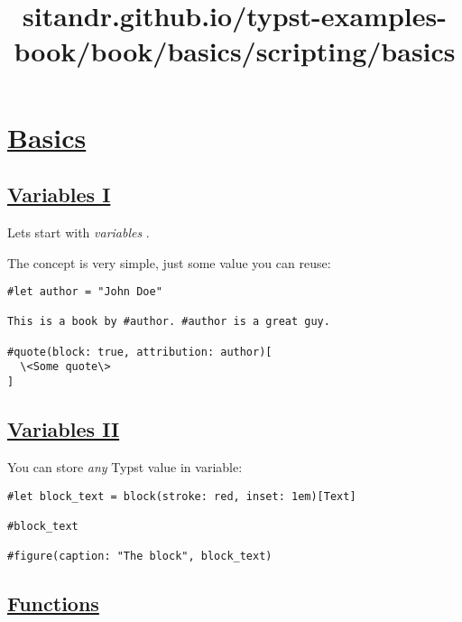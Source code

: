 \title{sitandr.github.io/typst-examples-book/book/basics/scripting/basics}

\section{\texorpdfstring{\hyperref[basics]{Basics}}{Basics}}\label{basics}

\subsection{\texorpdfstring{\hyperref[variables-i]{Variables
I}}{Variables I}}\label{variables-i}

Let\textquotesingle s start with \emph{variables} .

The concept is very simple, just some value you can reuse:

\begin{verbatim}
#let author = "John Doe"

This is a book by #author. #author is a great guy.

#quote(block: true, attribution: author)[
  \<Some quote\>
]
\end{verbatim}

\pandocbounded{}

\subsection{\texorpdfstring{\hyperref[variables-ii]{Variables
II}}{Variables II}}\label{variables-ii}

You can store \emph{any} Typst value in variable:

\begin{verbatim}
#let block_text = block(stroke: red, inset: 1em)[Text]

#block_text

#figure(caption: "The block", block_text)
\end{verbatim}

\pandocbounded{}

\subsection{\texorpdfstring{\hyperref[functions]{Functions}}{Functions}}\label{functions}

